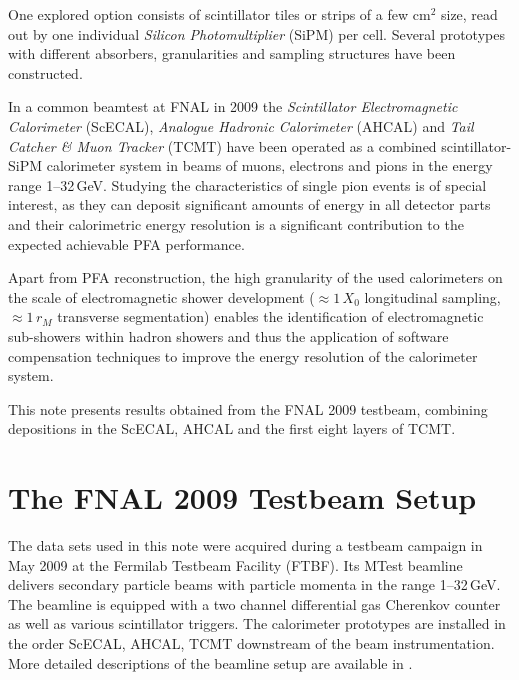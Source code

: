 \documentclass[twoside,a4paper,12pt]{article}
\begin{document}
One explored option consists of scintillator tiles or strips of a few cm${}^2$ size, read out by one individual \emph{Silicon Photomultiplier} (SiPM) per cell. Several prototypes with different absorbers, granularities and sampling structures have been constructed.  

In a common beamtest at FNAL in 2009 the \emph{Scintillator Electromagnetic Calorimeter} (ScECAL), \emph{Analogue Hadronic Calorimeter} (AHCAL) and \emph{Tail Catcher \& Muon Tracker} (TCMT) have been operated as a combined scintillator-SiPM calorimeter system in beams of muons, electrons and pions in the energy range 1--32\,GeV. Studying the characteristics of single pion events is of special interest, as they can deposit significant amounts of energy in all detector parts and their calorimetric energy resolution is a significant contribution to the expected achievable PFA performance. 

Apart from PFA reconstruction, the high granularity of the used calorimeters on the scale of electromagnetic shower development ($\approx1\,X_0$ longitudinal sampling, $\approx1\,r_M$ transverse segmentation) enables the identification of electromagnetic sub-showers within hadron showers and thus the application of software compensation techniques to improve the energy resolution of the calorimeter system. 

This note presents results obtained from the FNAL 2009 testbeam, combining depositions in the ScECAL, AHCAL and the first eight layers of TCMT.%


\section{The FNAL 2009 Testbeam Setup}
The data sets used in this note were acquired during a testbeam campaign in May 2009 at the Fermilab Testbeam Facility (FTBF). Its MTest beamline delivers secondary particle beams with particle momenta in the range 1--32\,GeV. The beamline is equipped with a two channel differential gas Cherenkov counter as well as various scintillator triggers. The calorimeter prototypes are installed in the order ScECAL, AHCAL, TCMT downstream of the beam instrumentation. More detailed descriptions of the beamline setup are available in \cite{Feege, CAN16}.
\end{document}
